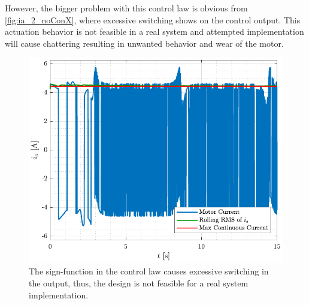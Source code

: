 %
However, the bigger problem with this control law is obvious from \autoref{fig:ia_2_noConX}, where excessive switching shows on the control output. This actuation behavior is not feasible in a real system and attempted implementation will cause chattering resulting in unwanted behavior and wear of the motor.
%
\begin{figure}[H]
  \includegraphics[width=.52\textwidth]{figures/ia_2_noConX}
  \caption{The sign-function in the control law causes excessive switching in the output, thus, the design is not feasible for a real system implementation.}
  \label{fig:ia_2_noConX}
\end{figure}
%
%
%
%


